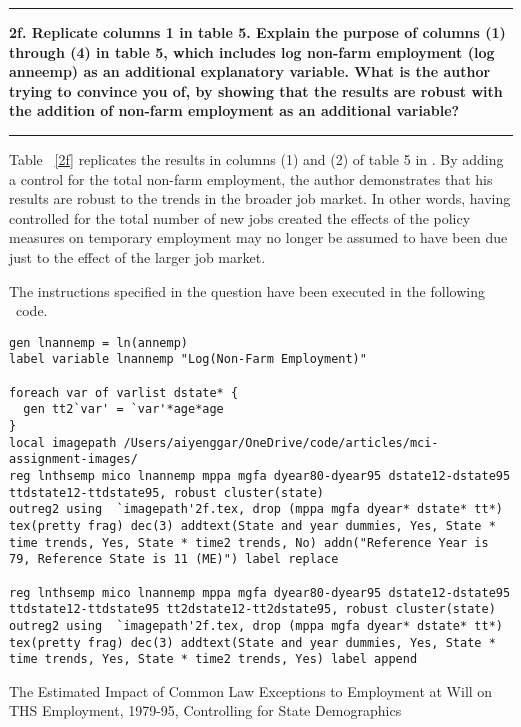 \documentclass[12pt]{article}
\newcommand\question[1]{\vspace{1em}\hrule\vspace{1em}\textbf{#1}\vspace{1em}\hrule\vspace{1em}}
\begin{document}
\newpage
\question{2f. Replicate columns 1 in table 5. Explain the purpose of columns (1) through (4) in table 5, which includes log non-farm employment (log anneemp) as an additional explanatory variable. What is the author trying to convince you of, by showing that the results are robust with the addition of non-farm employment as an additional variable?}
\noindent Table ~\ref{2f} replicates the results in columns (1) and (2) of table 5 in \cite{Autor2003}. By adding a control for the total non-farm employment, the author demonstrates that his results are robust to the trends in the broader job market. In other words, having controlled for the total number of new jobs created the effects of the policy measures on temporary employment may no longer be assumed to have been due just to the effect of the larger job market.

The instructions specified in the question have been executed in the following \stata \  code.\\
\begin{lstlisting}
gen lnannemp = ln(annemp)
label variable lnannemp "Log(Non-Farm Employment)"

foreach var of varlist dstate* {
  gen tt2`var' = `var'*age*age
}
local imagepath /Users/aiyenggar/OneDrive/code/articles/mci-assignment-images/
reg lnthsemp mico lnannemp mppa mgfa dyear80-dyear95 dstate12-dstate95 ttdstate12-ttdstate95, robust cluster(state)
outreg2 using  `imagepath'2f.tex, drop (mppa mgfa dyear* dstate* tt*) tex(pretty frag) dec(3) addtext(State and year dummies, Yes, State * time trends, Yes, State * time2 trends, No) addn("Reference Year is 79, Reference State is 11 (ME)") label replace

reg lnthsemp mico lnannemp mppa mgfa dyear80-dyear95 dstate12-dstate95 ttdstate12-ttdstate95 tt2dstate12-tt2dstate95, robust cluster(state)
outreg2 using  `imagepath'2f.tex, drop (mppa mgfa dyear* dstate* tt*) tex(pretty frag) dec(3) addtext(State and year dummies, Yes, State * time trends, Yes, State * time2 trends, Yes) label append
\end{lstlisting}

\begin{table}
\caption{The Estimated Impact of Common Law Exceptions to Employment at Will on THS Employment, 1979-95, Controlling for State Demographics}

\label{2f}
\end{table}
\end{document}
